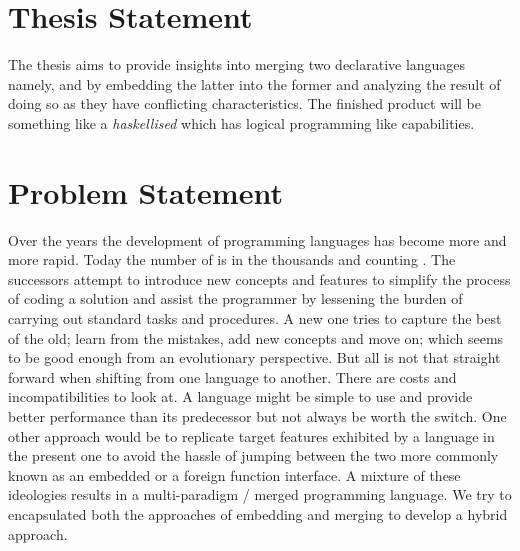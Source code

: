 \documentclass[thesis-solanki.tex]{subfiles}
\begin{document}
\section{Thesis Statement}

The thesis aims to provide insights into merging two declarative languages namely,  and
 by embedding the latter into the former and analyzing the result of doing so as they have conflicting
characteristics.
The finished product will be something like a \textit{haskellised}  which has logical programming like
capabilities.


\section{Problem Statement}

Over the years the development of programming languages has become more and more rapid.
Today the number of is in the thousands and counting \cite{website:timelineproglangwiki, website:historyofproglang}.
The successors attempt to introduce new concepts and features to simplify the process of coding a solution and assist
the programmer by lessening the burden of carrying out standard tasks and procedures.
A new one tries to capture the best of the old; learn from the mistakes, add new concepts and move on; which seems to be
good enough from an evolutionary perspective.
But all is not that straight forward when shifting from one language to another.
There are costs and incompatibilities to look at.
A language might be simple to use and provide better performance than its predecessor but not always be worth the
switch.
One other approach would be to replicate target features exhibited by a language in the present one to avoid the hassle of
jumping between the two more commonly known as an embedded or a foreign function interface. A mixture of these ideologies results in a 
multi-paradigm / merged programming language. We try to encapsulated both the approaches of embedding and merging to develop a hybrid 
approach.
\end{document}
